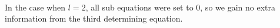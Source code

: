 \begin{align*}
\end{align*}
In the case when $l=2$, all sub equations were set to 0, so we gain no extra information from the third determining equation.